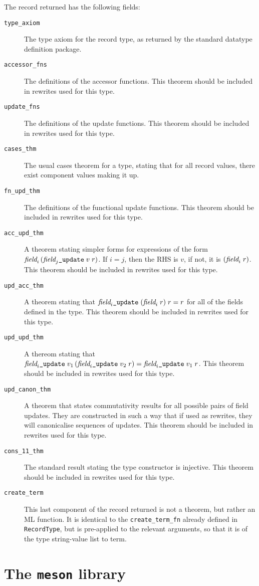The record returned has the following fields:
\newcommand{\rewruse}{This theorem should be included in rewrites used
  for this type.}
\newcommand{\field}[1]{\mbox{\it field}_{#1}}
\newcommand{\update}{\mbox{\tt\_update}}
\begin{description}
\item[{\tt type\_axiom}] The type axiom for the record type, as
  returned by the standard datatype definition package.
\item[{\tt accessor\_fns}] The definitions of the accessor functions.
  \rewruse
\item[{\tt update\_fns}] The definitions of the update functions.
  \rewruse
\item[{\tt cases\_thm}] The usual cases theorem for a type, stating
  that for all record values, there exist component values making it
  up.
\item[{\tt fn\_upd\_thm}] The definitions of the functional update
  functions.  \rewruse
\item[{\tt acc\_upd\_thm}] A theorem stating simpler forms for
  expressions of the form $\field{i}\, (\field{j}\update\;v\; r)$.  If
  $i = j$, then the RHS is $v$, if not, it is $(\field{i}\;r)$.
  \rewruse
\item[{\tt upd\_acc\_thm}] A theorem stating that $\field{i}\update
  \;(\field{i}\;r)\;r = r$ for all of
  the fields defined in the type. \rewruse
\item[{\tt upd\_upd\_thm}] A thereom stating that $\field{i}\update
  \;v_1 \,(\field{i}\update \;v_2\;r) = \field{i}\update\;v_1\;r$.
  \rewruse
\item[{\tt upd\_canon\_thm}] A theorem that states commutativity results
  for all possible pairs of field updates.  They are constructed in
  such a way that if used as rewrites, they will canonicalise
  sequences of updates. \rewruse
\item[{\tt cons\_11\_thm}] The standard result stating the type
  constructor is injective.  \rewruse
\item[{\tt create\_term}] This last component of the record returned
  is not a theorem, but rather an ML function.  It is identical to the
  {\tt create\_term\_fn} already defined in {\tt RecordType}, but is
  pre-applied to the relevant arguments, so that it is of the type
  string-value list to term.
\end{description}


\section{The {\tt meson} library}
